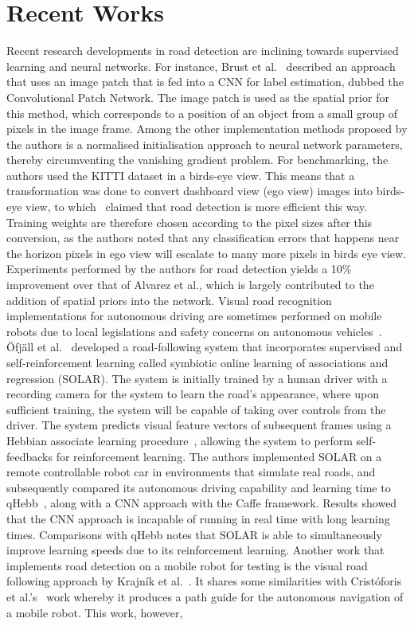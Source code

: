 \section{Recent Works} \label{secrecent}
Recent research developments in road detection are inclining towards supervised learning and neural networks. For instance, Brust et al.~\cite{brust_convolutional_2015} described an approach that uses an image patch that is fed into a CNN for label estimation, dubbed the Convolutional Patch Network. The image patch is used as the spatial prior for this method, which corresponds to a position of an object from a small group of pixels in the image frame. Among the other implementation methods proposed by the authors is a normalised initialisation approach to neural network parameters, thereby circumventing the vanishing gradient problem. For benchmarking, the authors used the KITTI dataset in a birds-eye view. This means that a transformation was done to convert dashboard view (ego view) images into birds-eye view, to which~\cite{jannik_fritsch_new_2013} claimed that road detection is more efficient this way. Training weights are therefore chosen according to the pixel sizes after this conversion, as the authors noted that any classification errors that happens near the horizon pixels in ego view will escalate to many more pixels in birds eye view. Experiments performed by the authors for road detection yields a 10\% improvement over that of Alvarez et al., which is largely contributed to the addition of spatial priors into the network. Visual road recognition implementations for autonomous driving are sometimes performed on mobile robots due to local legislations and safety concerns on autonomous vehicles~\cite{ofjall_visual_2016}. \"{O}fj\"{a}ll et al.~\cite{ofjall_visual_2016} developed a road-following system that incorporates supervised and self-reinforcement learning called symbiotic online learning of associations and regression (SOLAR). The system is initially trained by a human driver with a recording camera for the system to learn the road's appearance, where upon sufficient training, the system will be capable of taking over controls from the driver. The system predicts visual feature vectors of subsequent frames using a Hebbian associate learning procedure~\cite{ofjall_biologically_2014}, allowing the system to perform self-feedbacks for reinforcement learning. The authors implemented SOLAR on a remote controllable robot car in environments that simulate real roads, and subsequently compared its autonomous driving capability and learning time to qHebb~\cite{ofjall_biologically_2014}, along with a CNN approach with the Caffe framework. Results showed that the CNN approach is incapable of running in real time with long learning times. Comparisons with qHebb notes that SOLAR is able to simultaneously improve learning speeds due to its reinforcement learning.  Another work that implements road detection on a mobile robot for testing is the visual road following approach by Krajn{\'i}k et al.~\cite{tomas_krajnik_visual_2015}. It shares some similarities with Crist\'{o}foris et al.'s~\cite{cristoforis_real-time_2016} work whereby it produces a path guide for the autonomous navigation of a mobile robot. This work, however, 